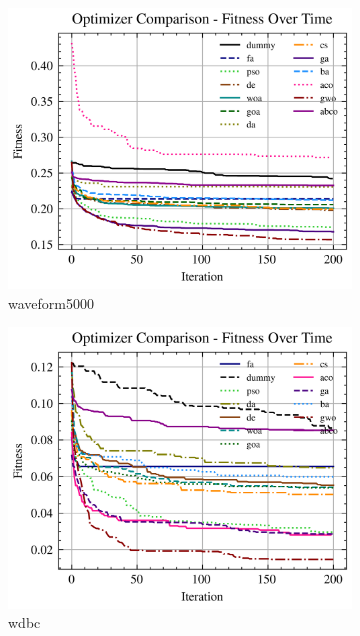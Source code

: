 \begin{figure}[htp]
    \begin{subfigure}[htp]{0.45\textwidth}
        \includegraphics[width=\textwidth]{imagenes/fitness_charts/img/binary/waveform5000/optimizers_fitness_knn.png}
        \caption{waveform5000}
    \end{subfigure}
    \begin{subfigure}[htp]{0.45\textwidth}
        \includegraphics[width=\textwidth]{imagenes/fitness_charts/img/binary/wdbc/optimizers_fitness_knn.png}
        \caption{wdbc}
    \end{subfigure}
    \begin{subfigure}[htp]{0.45\textwidth}

\end{subfigure}
\end{figure}

